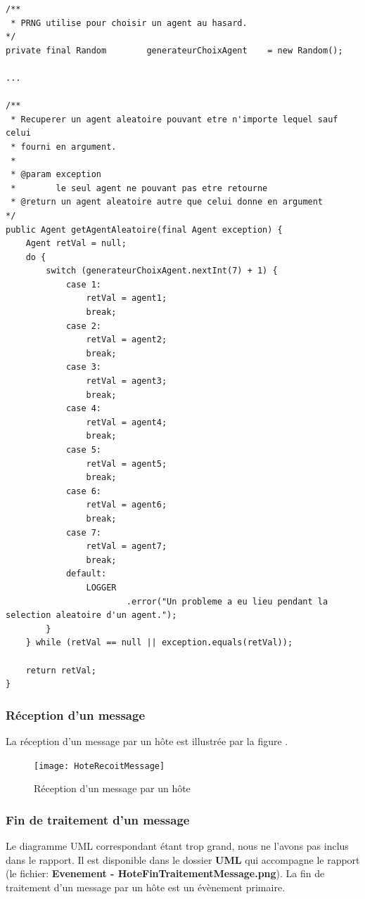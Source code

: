 \documentclass[a4paper,11pt]{article}
\begin{document}
\begin{lstlisting}[caption=Utilisation des variables aléatoires pour sélectionner un agent]
/**
 * PRNG utilise pour choisir un agent au hasard.
*/
private final Random		generateurChoixAgent	= new Random();
	
...

/**
 * Recuperer un agent aleatoire pouvant etre n'importe lequel sauf celui
 * fourni en argument.
 * 
 * @param exception
 *        le seul agent ne pouvant pas etre retourne
 * @return un agent aleatoire autre que celui donne en argument
*/
public Agent getAgentAleatoire(final Agent exception) {
	Agent retVal = null;
	do {
		switch (generateurChoixAgent.nextInt(7) + 1) {
			case 1:
				retVal = agent1;
				break;
			case 2:
				retVal = agent2;
				break;
			case 3:
				retVal = agent3;
				break;
			case 4:
				retVal = agent4;
				break;
			case 5:
				retVal = agent5;
				break;
			case 6:
				retVal = agent6;
				break;
			case 7:
				retVal = agent7;
				break;
			default:
				LOGGER
						.error("Un probleme a eu lieu pendant la selection aleatoire d'un agent.");
		}
	} while (retVal == null || exception.equals(retVal));
	
	return retVal;
}
\end{lstlisting}

\clearpage











\subsubsection{Réception d'un message}
La réception d'un message par un hôte est illustrée par la figure .

\begin{figure}[h!t]
  \centering
    \texttt{[image: HoteRecoitMessage]}
  \caption{Réception d'un message par un hôte}
  \label{fig:hote-recoit-message}
\end{figure}








\subsubsection{Fin de traitement d'un message}
Le diagramme UML correspondant étant trop grand, nous ne l'avons pas inclus dans le rapport. Il est disponible dans le dossier \textbf{UML} qui accompagne le rapport (le fichier: \textbf{Evenement - HoteFinTraitementMessage.png}). La fin de traitement d'un message par un hôte est un évènement primaire.
\end{document}
